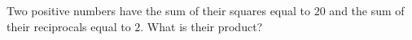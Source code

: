 Two positive numbers have the sum of their squares equal to $20$ and the sum of their reciprocals equal to $2$. What is their product?

